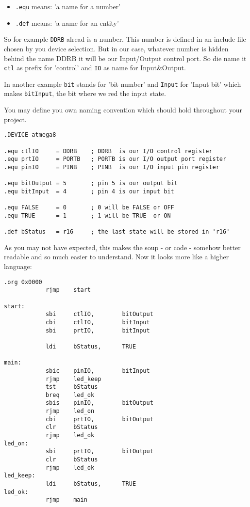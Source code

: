 \begin{itemize}
  \item \texttt{.equ} means: 'a name for a number'
  \item \texttt{.def} means: 'a name for an entity'
\end{itemize}

So for example \texttt{DDRB} alread is a number. This number is defined in an include file chosen by you device selection. But in our case, whatever number is hidden behind the name DDRB it will be our Input/Output control port. So die name it \texttt{ctl} as prefix for 'control' and \texttt{IO} as name for Input\&Output.

In another example \texttt{bit} stands for 'bit number' and \texttt{Input} for 'Input bit' which makes \texttt{bitInput}, the bit where we red the input state.

You may define you own naming convention which should hold throughout your project.

\begin{lstlisting}
.DEVICE atmega8

.equ ctlIO     = DDRB    ; DDRB  is our I/O control register
.equ prtIO     = PORTB   ; PORTB is our I/O output port register
.equ pinIO     = PINB    ; PINB  is our I/O input pin register

.equ bitOutput = 5       ; pin 5 is our output bit
.equ bitInput  = 4       ; pin 4 is our input bit

.equ FALSE     = 0       ; 0 will be FALSE or OFF
.equ TRUE      = 1       ; 1 will be TRUE  or ON

.def bStatus   = r16     ; the last state will be stored in 'r16'
\end{lstlisting}

As you may not have expected, this makes the soup - or code - somehow better readable and so much easier to understand. Now it looks more like a higher language:

\begin{lstlisting}
.org 0x0000
            rjmp    start

start:
            sbi     ctlIO,        bitOutput
            cbi     ctlIO,        bitInput
            sbi     prtIO,        bitInput

            ldi     bStatus,      TRUE

main:
            sbic    pinIO,        bitInput
            rjmp    led_keep
            tst     bStatus
            breq    led_ok
            sbis    pinIO,        bitOutput
            rjmp    led_on
            cbi     prtIO,        bitOutput
            clr     bStatus
            rjmp    led_ok
led_on:
            sbi     prtIO,        bitOutput
            clr     bStatus
            rjmp    led_ok
led_keep:
            ldi     bStatus,      TRUE
led_ok:
            rjmp    main
\end{lstlisting}

